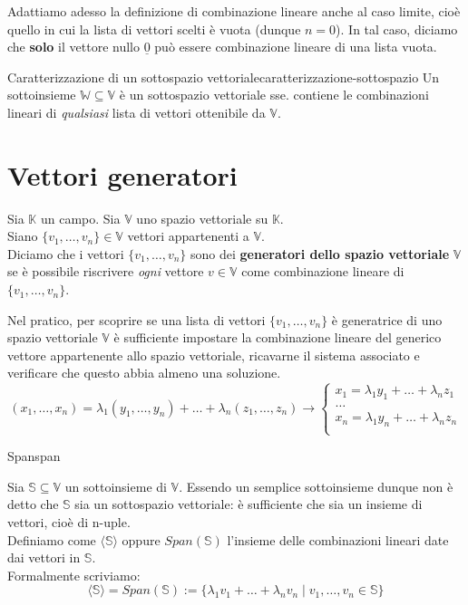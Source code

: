 \documentclass[12pt]{report}
\newcommand{\K}{\mathbb{K}}
\newcommand{\V}{\mathbb{V}}
\newcommand{\W}{\mathbb{W}}
\newcommand{\genericvector}[1]{(#1_1, \dots, #1_n)}
\newcommand{\vectors}[1]{#1_1, \dots, #1_n}
\newcommand{\nullvector}{\underline{0}}
\begin{document}
	Adattiamo adesso la definizione di combinazione lineare anche al caso limite, cioè quello in cui la lista di vettori scelti è vuota (dunque $n = 0$). In tal caso, diciamo che \textbf{solo} il vettore nullo $\nullvector$ può essere combinazione lineare di una lista vuota.
	
	\begin{teorema}{Caratterizzazione di un sottospazio vettoriale}{caratterizzazione-sottospazio}
		Un sottoinsieme $\W \subseteq \V$ è un sottospazio vettoriale sse. contiene le combinazioni lineari di \textit{qualsiasi} lista di vettori ottenibile da $\V$.
	\end{teorema}
	
	\section{Vettori generatori}
	Sia $\K$ un campo. Sia $\V$ uno spazio vettoriale su $\K$.\\
	Siano $\{\vectors{v}\} \in \V$ vettori appartenenti a $\V$.\\
	Diciamo che i vettori $\{\vectors{v}\}$ sono dei \textbf{generatori dello spazio vettoriale} $\mathbf{\V}$ se è possibile riscrivere \textit{ogni} vettore $v \in \V$ come combinazione lineare di $\{\vectors{v}\}$.
	
	Nel pratico, per scoprire se una lista di vettori $\{\vectors{v}\}$ è generatrice di uno spazio vettoriale $\V$ è sufficiente impostare la combinazione lineare del generico vettore appartenente allo spazio vettoriale, ricavarne il sistema associato e verificare che questo abbia almeno una soluzione.
	\[
		\genericvector{x} = \lambda_1(y_1, \dots, y_n) + \dots + \lambda_n(z_1, \dots, z_n) \to
		\begin{cases}
			x_1 = \lambda_1y_1 + \dots + \lambda_nz_1\\
			\dots\\
			x_n = \lambda_1y_n + \dots + \lambda_nz_n\\
		\end{cases}
	\]
	
	\begin{definizione}{Span}{span}
		
		Sia $\mathbb{S} \subseteq \V$ un sottoinsieme di $\V$. Essendo un semplice sottoinsieme dunque non è detto che $\mathbb{S}$ sia un sottospazio vettoriale: è sufficiente che sia un insieme di vettori, cioè di n-uple.\\
		Definiamo come $\mathbb{\langle S\rangle} \text{ oppure } Span(\mathbb{S})$ l'insieme delle combinazioni lineari date dai vettori in $\mathbb{S}$. \\
		Formalmente scriviamo:
		\[
			\langle\mathbb{S}\rangle = Span(\mathbb{S}) := \{ \lambda_1v_1 + \dots + \lambda_nv_n \mid \vectors{v} \in \mathbb{S} \}
		\]
		
	\end{definizione}
	
\end{document}
